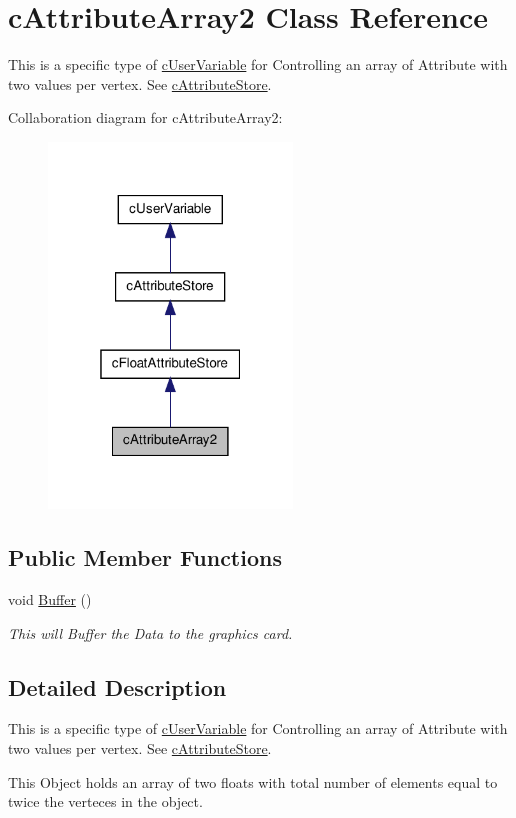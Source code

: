 \hypertarget{classc_attribute_array2}{
\section{cAttributeArray2 Class Reference}
\label{classc_attribute_array2}
}


This is a specific type of \hyperlink{classc_user_variable}{cUserVariable} for Controlling an array of Attribute with two values per vertex. See \hyperlink{classc_attribute_store}{cAttributeStore}.  




Collaboration diagram for cAttributeArray2:\nopagebreak
\begin{figure}[H]
\begin{center}
\leavevmode
\includegraphics[width=184pt]{classc_attribute_array2__coll__graph}
\end{center}
\end{figure}
\subsection*{Public Member Functions}
\begin{DoxyCompactItemize}
\item 
\hypertarget{classc_attribute_array2_ab668d78ce789f131bb4335ae1f7312df}{
void \hyperlink{classc_attribute_array2_ab668d78ce789f131bb4335ae1f7312df}{Buffer} ()}
\label{classc_attribute_array2_ab668d78ce789f131bb4335ae1f7312df}

\begin{DoxyCompactList}\small\item\em This will Buffer the Data to the graphics card. \end{DoxyCompactList}\end{DoxyCompactItemize}


\subsection{Detailed Description}
This is a specific type of \hyperlink{classc_user_variable}{cUserVariable} for Controlling an array of Attribute with two values per vertex. See \hyperlink{classc_attribute_store}{cAttributeStore}. 

This Object holds an array of two floats with total number of elements equal to twice the verteces in the object. 